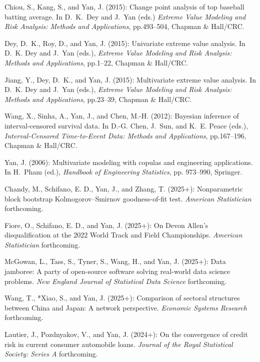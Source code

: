 \documentclass[Statistics]{vita}
\begin{document}
\begin{vita}
\begin{Publications}
\begin{BookChapters}
  \item *Chiou, S., Kang, S., and Yan, J. (2015): Change point analysis of top baseball batting average. In D.~K.~Dey and J.~Yan (eds.) {\em Extreme Value Modeling and Risk Analysis: Methods and Applications\/}, pp.493--504, Chapman \& Hall/CRC.
  \item Dey, D.~K., Roy, D., and Yan, J. (2015): Univariate extreme value analysis. In D.~K. Dey and J.~Yan (eds.), {\em Extreme Value Modeling and Risk Analysis: Methods and Applications\/}, pp.1--22, Chapman \& Hall/CRC.
  \item *Jiang, Y., Dey, D.~K., and Yan, J. (2015): Multivariate extreme value analysis. In D.~K. Dey and J.~Yan (eds.), {\em Extreme Value Modeling and Risk Analysis: Methods and Applications\/}, pp.23--39, Chapman \& Hall/CRC.
  \item *Wang, X., Sinha, A., Yan, J., and Chen, M.-H. (2012): Bayesian inference of interval-censored survival data. In D.-G. Chen, J.~Sun, and  K.~E. Peace (eds.), {\em Interval-Censored Time-to-Event Data: {M}ethods and Applications\/}, pp.167--196, Chapman \& Hall/CRC.
  \item Yan, J. (2006): Multivariate modeling with copulas and engineering applications. In H.~Pham (ed.), {\em Handbook of Engineering Statistics\/}, pp. 973--990, Springer.
  \end{BookChapters}
  \begin{RefereedJournalArticles}
  \item *Chandy, M., Schifano, E. D., Yan, J., and Zhang, T. (2025+): Nonparametric block bootstrap Kolmogorov--Smirnov goodness-of-fit test. {\em American Statistician\/} forthcoming.
  \item *Fiore, O., Schifano, E. D., and Yan, J. (2025+): On Devon Allen’s disqualification at the 2022 World Track and Field Championships. {\em American Statistician\/} forthcoming.
  \item McGowan, L., Tass, S., Tyner, S., Wang, H., and Yan, J. (2025+): Data jamboree: A party of open-source software solving real-world data science problems. {\em New England Journal of Statistical Data Science\/} forthcoming.
  \item *Wang, T., *Xiao, S., and Yan, J. (2025+): Comparison of sectoral structures between China and Japan: A network perspective. {\em Economic Systems Research\/} forthcoming.
  \item *Lautier, J., Pozdnyakov, V., and Yan, J. (2024+): On the convergence of credit risk in current consumer automobile loans. {\em Journal of the Royal Statistical Society: Series A\/} forthcoming.

\end{RefereedJournalArticles}
\end{Publications}
\end{vita}
\end{document}
